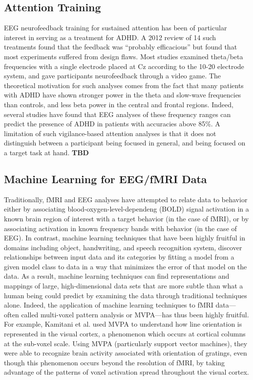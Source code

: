 \documentclass[12pt]{report}
\begin{document}
\subsection{Attention Training}
	EEG neurofeedback training for sustained attention has been of particular interest in serving as a treatment for ADHD.  A 2012 review\cite{Lofthouse} of 14 such treatments found that the feedback was ``probably efficacious'' but found that most experiments suffered from design flaws.  Most studies examined theta/beta frequencies with a single electrode placed at Cz according to the 10-20 electrode system, and gave participants neurofeedback through a video game.  The theoretical motivation for such analyses comes from the fact that many patients with ADHD have shown stronger power in the theta and slow-wave frequencies than controls, and less beta power in the central and frontal regions.  Indeed, several studies\cite{Barry} have found that EEG analyses of these frequency ranges can predict the presence of ADHD in patients with accuracies above 85\%.  A limitation of such vigilance-based attention analyses is that it does not distinguish between a participant being focused in general, and being focused on a target task at hand. {\bf TBD}
	
\subsection{Machine Learning for EEG/fMRI Data}
	Traditionally, fMRI and EEG analyses have attempted to relate data to behavior either by associating blood-oxygen-level-dependeng (BOLD) signal activation in a known brain region of interest with a target behavior (in the case of fMRI)\cite{Schnyer}, or by associating activation in known frequency bands with behavior (in the case of EEG).  In contrast, machine learning techniques that have been highly fruitful in domains including object, handwriting, and speech recognition system, discover relationships between input data and its categories by fitting a model from a given model class to data in a way that minimizes the error of that model on the data.  As a result, machine learning techniques can find representations and mappings of large, high-dimensional data sets that are more subtle than what a human being could predict by examining the data through traditional techniques alone.  Indeed, the application of machine learning techniques to fMRI data---often called multi-voxel pattern analysis or MVPA---has thus been highly fruitful\cite{Norman}.  For example, Kamitani et al. \cite{Kamitani} used MVPA to understand how line orientation is represented in the visual cortex, a phenomenon which occurs at cortical columns at the sub-voxel scale.   Using MVPA (particularly support vector machines), they were able to recognize brain activity associated with orientation of gratings, even though this phenomenon occurs beyond the resolution of fMRI, by taking advantage of the patterns of voxel activation spread throughout the visual cortex.  
		
\end{document}

